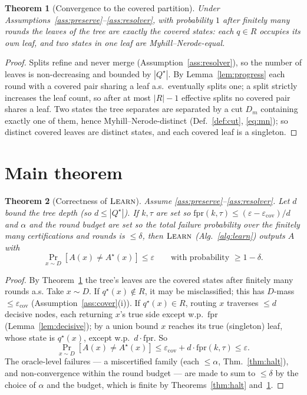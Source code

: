 \documentclass[11pt]{article}
\newtheorem{theorem}{Theorem}
\newcommand{\fpr}{\mathrm{fpr}}
\begin{document}
\begin{theorem}[Convergence to the covered partition]\label{thm:converge}
Under Assumptions~\ref{ass:preserve}--\ref{ass:resolver}, with probability $1$
after finitely many rounds the leaves of the tree are exactly the covered states:
each $q\in R$ occupies its own leaf, and two states in one leaf are
Myhill--Nerode-equal.
\end{theorem}
\begin{proof}
Splits refine and never merge (Assumption~\ref{ass:resolver}), so the number of
leaves is non-decreasing and bounded by $|Q^\star|$. By Lemma~\ref{lem:progress}
each round with a covered pair sharing a leaf a.s.\ eventually splits one; a split
strictly increases the leaf count, so after at most $|R|-1$ effective splits no
covered pair shares a leaf. Two states the tree separates are separated by a cut
$D_m$ containing exactly one of them, hence Myhill--Nerode-distinct
(Def.~\ref{def:cut}, \eqref{eq:mn}); so distinct covered leaves are distinct
states, and each covered leaf is a singleton.
\end{proof}

\section{Main theorem}\label{sec:main}

\begin{theorem}[Correctness of $\textsc{Learn}$]\label{thm:main}
Assume \ref{ass:preserve}--\ref{ass:resolver}. Let $d$ bound the tree depth (so
$d\le|Q^\star|$). If $k,\tau$ are set so $\fpr(k,\tau)\le(\varepsilon-\varepsilon_{\mathrm{cov}})/d$
and $\alpha$ and the round budget are set so the total failure probability over the
finitely many certifications and rounds is $\le\delta$, then $\textsc{Learn}$
(Alg.~\ref{alg:learn}) outputs $A$ with
\[
  \Pr_{x\sim D}[A(x)\ne A^\star(x)]\le\varepsilon
  \qquad\text{with probability }\ge 1-\delta .
\]
\end{theorem}
\begin{proof}
By Theorem~\ref{thm:converge} the tree's leaves are the covered states after
finitely many rounds a.s. Take $x\sim D$. If $q^\star(x)\notin R$, it may be
misclassified; this has $D$-mass $\le\varepsilon_{\mathrm{cov}}$
(Assumption~\ref{ass:cover}(i)). If $q^\star(x)\in R$, routing $x$ traverses
$\le d$ decisive nodes, each returning $x$'s true side except w.p.\ $\fpr$
(Lemma~\ref{lem:decisive}); by a union bound $x$ reaches its true (singleton) leaf,
whose state is $q^\star(x)$, except w.p.\ $d\cdot\fpr$. So
\[
  \Pr_{x\sim D}[A(x)\ne A^\star(x)]\le\varepsilon_{\mathrm{cov}}+d\cdot\fpr(k,\tau)\le\varepsilon .
\]
The oracle-level failures --- a miscertified family (each $\le\alpha$,
Thm.~\ref{thm:halt}), and non-convergence within the round budget --- are made to
sum to $\le\delta$ by the choice of $\alpha$ and the budget, which is finite by
Theorems~\ref{thm:halt} and~\ref{thm:converge}.
\end{proof}
\end{document}
